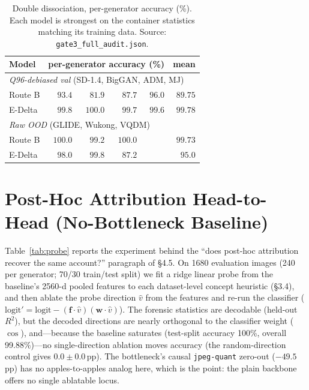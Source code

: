 \begin{table}[h]
  \centering
  \caption{Double dissociation, per-generator accuracy (\%). Each model is strongest on the
    container statistics matching its training data. Source:
    \texttt{gate3\_full\_audit.json}.}
  \label{tab:dissoc}
  \small
  \begin{tabular}{lrrrrr}
    \toprule
    Model & \multicolumn{4}{c}{per-generator accuracy (\%)} & mean \\
    \midrule
    \multicolumn{6}{l}{\emph{Q96-debiased val} \quad (SD-1.4, BigGAN, ADM, MJ)} \\
    Route B & $93.4$ & $81.9$ & $87.7$ & $96.0$ & $89.75$ \\
    E-Delta & $99.8$ & $100.0$ & $99.7$ & $99.6$ & $99.78$ \\
    \midrule
    \multicolumn{6}{l}{\emph{Raw OOD} \quad (GLIDE, Wukong, VQDM)} \\
    Route B & $100.0$ & $99.2$ & $100.0$ &        & $99.73$ \\
    E-Delta & $98.0$  & $99.8$ & $87.2$  &        & $95.0$ \\
    \bottomrule
  \end{tabular}
\end{table}

\section{Post-Hoc Attribution Head-to-Head (No-Bottleneck Baseline)}
\label{app:probe}

Table~\ref{tab:probe} reports the experiment behind the ``does post-hoc attribution recover
the same account?'' paragraph of \S{}4.5. On 1680 evaluation images (240 per generator;
70/30 train/test split) we fit a ridge linear probe from the baseline's 2560-d pooled
features to each dataset-level concept heuristic (\S{}3.4), and then ablate the probe
direction $\hat{v}$ from the features and re-run the classifier
($\text{logit}'=\text{logit}-(\mathbf{f}\!\cdot\!\hat{v})(\mathbf{w}\!\cdot\!\hat{v})$). The
forensic statistics are decodable (held-out $R^2$), but the decoded directions are nearly
orthogonal to the classifier weight ($\cos$), and---because the baseline saturates
(test-split accuracy 100\%, overall 99.88\%)---no single-direction ablation moves accuracy
(the random-direction control gives $0.0\pm0.0$\,pp). The bottleneck's causal
\texttt{jpeg-quant} zero-out ($-49.5$\,pp) has no apples-to-apples analog here, which is the
point: the plain backbone offers no single ablatable locus.

